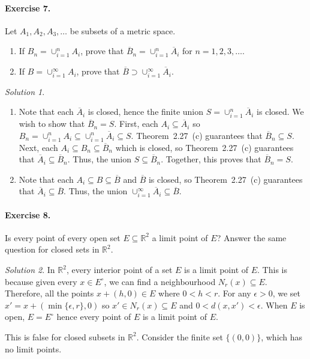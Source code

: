 \documentclass[11pt]{report}
\def\R{\mathbb{R}}
\theoremstyle{remark}
\newtheorem*{solution}{Solution}
\begin{document}
    \paragraph{Exercise 7.} Let $A_1, A_2, A_3, \dots$ be subsets of a metric space.
    \begin{enumerate}
        \itemsep0em
        \item If $B_n = \cup_{i = 1}^n A_i$, prove that $\overline{B}_n = \cup_{i =
        1}^n \overline{A}_i$ for $n = 1, 2, 3, \dots$.
        \item If $B = \cup_{i = 1}^\infty A_i$, prove that $\overline{B} \supset
        \cup_{i = 1}^\infty \overline{A}_i$.
    \end{enumerate}
    \begin{solution} \mbox{}
        \begin{enumerate}
            \item Note that each $\overline{A}_i$ is closed, hence the finite union
            $S = \cup_{i = 1}^n \overline{A}_i$ is closed. We wish to show that $
            \overline{B}_n = S$. First, each $A_i \subseteq \overline{A}_i$ so $B_n
            = \cup_{i = 1}^n A_i \subseteq \cup_{i = 1}^n \overline{A}_i \subseteq
            S$. Theorem~2.27~(c) guarantees that $\overline{B}_n \subseteq S$. Next,
            each $A_i \subseteq B_n \subseteq \overline{B}_n$ which is closed,  so
            Theorem~2.27~(c) guarantees that $\overline{A}_i \subseteq
            \overline{B}_n$. Thus, the union $S \subseteq \overline{B}_n$.
            Together, this proves that $\overline{B}_n = S$.

            \item Note that each $A_i \subseteq B \subseteq \overline{B}$ and
            $\overline{B}$ is closed, so Theorem~2.27~(c) guarantees that
            $\overline{A}_i \subseteq \overline{B}$. Thus, the union $\cup_{i =
            1}^\infty \overline{A}_i \subseteq \overline B$.
        \end{enumerate}
    \end{solution}

    \paragraph{Exercise 8.} Is every point of every open set $E \subseteq \R^2$ a limit
    point of $E$? Answer the same question for closed sets in $\R^2$.
    \begin{solution}
        In $\R^2$, every interior point of a set $E$ is a limit point of $E$. This
        is because given every $x \in E^\circ$, we can find a neighbourhood $N_r(x)
        \subseteq E$. Therefore, all the points $x + (h, 0) \in E$ where $0 < h <
        r$. For any $\epsilon > 0$, we set $x' = x + (\min\{\epsilon, r\}, 0)$ so
        $x' \in N_r(x) \subseteq E$ and $0 < d(x, x') < \epsilon$. When $E$ is open,
        $E = E^\circ$ hence every point of $E$ is a limit point of $E$.

        This is false for closed subsets in $\R^2$. Consider the finite set $\{(0,
        0)\}$, which has no limit points.
    \end{solution}
    
\end{document}
